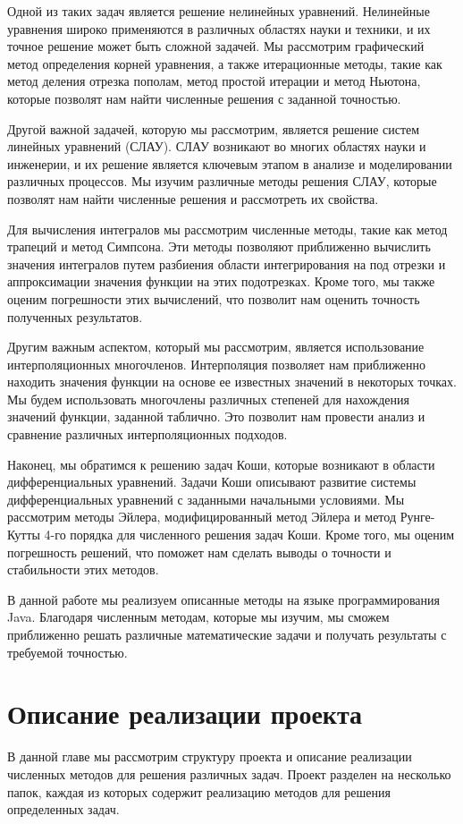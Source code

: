 \documentclass[12pt]{article}
\begin{document}
    Одной из таких задач является решение нелинейных уравнений. Нелинейные уравнения широко применяются в различных областях науки и техники, и их точное решение может быть сложной задачей. Мы рассмотрим графический метод определения корней уравнения, а также итерационные методы, такие как метод деления отрезка пополам, метод простой итерации и метод Ньютона, которые позволят нам найти численные решения с заданной точностью.

    Другой важной задачей, которую мы рассмотрим, является решение систем линейных уравнений (СЛАУ). СЛАУ возникают во многих областях науки и инженерии, и их решение является ключевым этапом в анализе и моделировании различных процессов. Мы изучим различные методы решения СЛАУ, которые позволят нам найти численные решения и рассмотреть их свойства.

    Для вычисления интегралов мы рассмотрим численные методы, такие как метод трапеций и метод Симпсона. Эти методы позволяют приближенно вычислить значения интегралов путем разбиения области интегрирования на под отрезки и аппроксимации значения функции на этих подотрезках. Кроме того, мы также оценим погрешности этих вычислений, что позволит нам оценить точность полученных результатов.

    Другим важным аспектом, который мы рассмотрим, является использование интерполяционных многочленов. Интерполяция позволяет нам приближенно находить значения функции на основе ее известных значений в некоторых точках. Мы будем использовать многочлены различных степеней для нахождения значений функции, заданной таблично. Это позволит нам провести анализ и сравнение различных интерполяционных подходов.

    Наконец, мы обратимся к решению задач Коши, которые возникают в области дифференциальных уравнений. Задачи Коши описывают развитие системы дифференциальных уравнений с заданными начальными условиями. Мы рассмотрим методы Эйлера, модифицированный метод Эйлера и метод Рунге-Кутты 4-го порядка для численного решения задач Коши. Кроме того, мы оценим погрешность решений, что поможет нам сделать выводы о точности и стабильности этих методов.

    В данной работе мы реализуем описанные методы на языке программирования Java. Благодаря численным методам, которые мы изучим, мы сможем приближенно решать различные математические задачи и получать результаты с требуемой точностью.

    \newpage


    \section{Описание реализации проекта}
    В данной главе мы рассмотрим структуру проекта и описание реализации численных методов для решения различных задач.
    Проект разделен на несколько папок, каждая из которых содержит реализацию методов для решения определенных задач.
\end{document}
